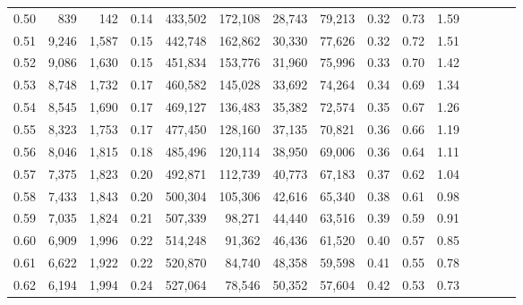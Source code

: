 \begin{tabular}{rrrcrrrrrrrrrrr}
0.50 &     839 &    142 &                                       0.14 &  433,502 &  172,108 &   28,743 &   79,213 &  0.32 &  0.73 &                         1.59 \\
0.51 &   9,246 &  1,587 &                                       0.15 &  442,748 &  162,862 &   30,330 &   77,626 &  0.32 &  0.72 &                         1.51 \\
0.52 &   9,086 &  1,630 &                                       0.15 &  451,834 &  153,776 &   31,960 &   75,996 &  0.33 &  0.70 &                         1.42 \\
0.53 &   8,748 &  1,732 &                                       0.17 &  460,582 &  145,028 &   33,692 &   74,264 &  0.34 &  0.69 &                         1.34 \\
0.54 &   8,545 &  1,690 &                                       0.17 &  469,127 &  136,483 &   35,382 &   72,574 &  0.35 &  0.67 &                         1.26 \\
0.55 &   8,323 &  1,753 &                                       0.17 &  477,450 &  128,160 &   37,135 &   70,821 &  0.36 &  0.66 &                         1.19 \\
0.56 &   8,046 &  1,815 &                                       0.18 &  485,496 &  120,114 &   38,950 &   69,006 &  0.36 &  0.64 &                         1.11 \\
0.57 &   7,375 &  1,823 &                                       0.20 &  492,871 &  112,739 &   40,773 &   67,183 &  0.37 &  0.62 &                         1.04 \\
0.58 &   7,433 &  1,843 &                                       0.20 &  500,304 &  105,306 &   42,616 &   65,340 &  0.38 &  0.61 &                         0.98 \\
0.59 &   7,035 &  1,824 &                                       0.21 &  507,339 &   98,271 &   44,440 &   63,516 &  0.39 &  0.59 &                         0.91 \\
0.60 &   6,909 &  1,996 &                                       0.22 &  514,248 &   91,362 &   46,436 &   61,520 &  0.40 &  0.57 &                         0.85 \\
0.61 &   6,622 &  1,922 &                                       0.22 &  520,870 &   84,740 &   48,358 &   59,598 &  0.41 &  0.55 &                         0.78 \\
0.62 &   6,194 &  1,994 &                                       0.24 &  527,064 &   78,546 &   50,352 &   57,604 &  0.42 &  0.53 &                         0.73 \\

\end{tabular}
